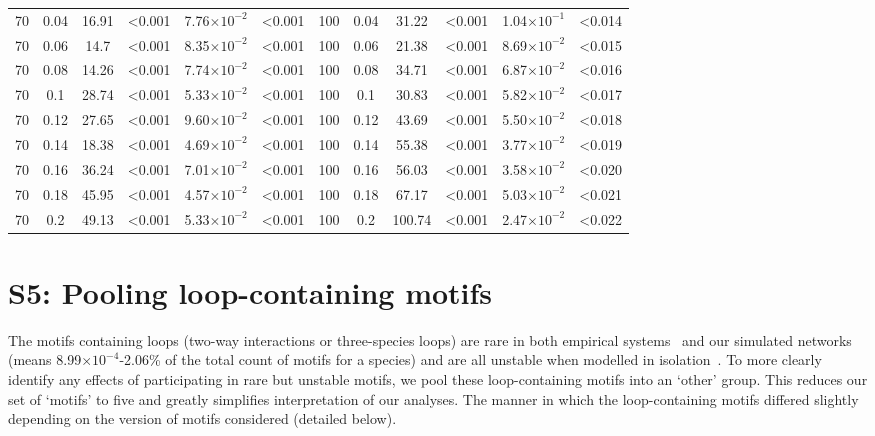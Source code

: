 \documentclass[12pt]{article}
\begin{document}
\begin{spacing}{2.0}
\begin{table}[h!]
\begin{tabular}{c c | c c| c c ||c c | c c | c c |}
            70  & 0.04  & 16.91 & \textless0.001  & 7.76$\times10^{-2}$ & \textless0.001  & 100 & 0.04  & 31.22 & \textless0.001  & 1.04$\times10^{-1}$ & \textless0.014  \\
            70  & 0.06  & 14.7  & \textless0.001  & 8.35$\times10^{-2}$ & \textless0.001  & 100 & 0.06  & 21.38 & \textless0.001  & 8.69$\times10^{-2}$ & \textless0.015  \\
            70  & 0.08  & 14.26 & \textless0.001  & 7.74$\times10^{-2}$ & \textless0.001  & 100 & 0.08  & 34.71 & \textless0.001  & 6.87$\times10^{-2}$ & \textless0.016  \\
            70  & 0.1 & 28.74 & \textless0.001  & 5.33$\times10^{-2}$ & \textless0.001  & 100 & 0.1 & 30.83 & \textless0.001  & 5.82$\times10^{-2}$ & \textless0.017  \\
            70  & 0.12  & 27.65 & \textless0.001  & 9.60$\times10^{-2}$ & \textless0.001  & 100 & 0.12  & 43.69 & \textless0.001  & 5.50$\times10^{-2}$ & \textless0.018  \\
            70  & 0.14  & 18.38 & \textless0.001  & 4.69$\times10^{-2}$ & \textless0.001  & 100 & 0.14  & 55.38 & \textless0.001  & 3.77$\times10^{-2}$ & \textless0.019  \\
            70  & 0.16  & 36.24 & \textless0.001  & 7.01$\times10^{-2}$ & \textless0.001  & 100 & 0.16  & 56.03 & \textless0.001  & 3.58$\times10^{-2}$ & \textless0.020  \\
            70  & 0.18  & 45.95 & \textless0.001  & 4.57$\times10^{-2}$ & \textless0.001  & 100 & 0.18  & 67.17 & \textless0.001  & 5.03$\times10^{-2}$ & \textless0.021  \\
            70  & 0.2 & 49.13 & \textless0.001  & 5.33$\times10^{-2}$ & \textless0.001  & 100 & 0.2 & 100.74  & \textless0.001  & 2.47$\times10^{-2}$ & \textless0.022  \\
        \hline
	    \end{tabular}
	    \end{table}


\clearpage


\section*{S5: Pooling loop-containing motifs} 
	
	The motifs containing loops (two-way interactions or three-species loops) are rare in both empirical systems~\citep{Stouffer2007} and our simulated networks (means 8.99$\times10^{-4}$-2.06\% of the total count of motifs for a species) and are all unstable when modelled in isolation~\citep{Borrelli2015a}.
	To more clearly identify any effects of participating in rare but unstable motifs, we pool these loop-containing motifs into an `other' group.
	This reduces our set of `motifs' to five and greatly simplifies interpretation of our analyses.
	The manner in which the loop-containing motifs differed slightly depending on the version of motifs considered (detailed below).



\end{spacing}
\end{document}
